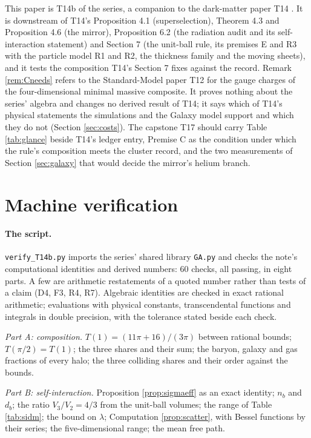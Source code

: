 \documentclass[11pt]{article}
\theoremstyle{definition}
\newcommand{\file}[1]{\texttt{#1}}
\begin{document}
This paper is T14b of the series, a companion to the dark-matter paper T14 \cite{ButlerT14}. It is downstream of T14's Proposition 4.1 (superselection), Theorem 4.3 and Proposition 4.6 (the mirror), Proposition 6.2 (the radiation audit and its self-interaction statement) and Section 7 (the unit-ball rule, its premises E and R3 with the particle model R1 and R2, the thickness family and the moving sheets), and it tests the composition T14's Section 7 fixes against the record. Remark \ref{rem:Cneeds} refers to the Standard-Model paper T12 \cite{ButlerT12} for the gauge charges of the four-dimensional minimal massive composite. It proves nothing about the series' algebra and changes no derived result of T14; it says which of T14's physical statements the simulations and the Galaxy model support and which they do not (Section \ref{sec:costs}). The capstone T17 \cite{ButlerT17} should carry Table \ref{tab:glance} beside T14's ledger entry, Premise C as the condition under which the rule's composition meets the cluster record, and the two measurements of Section \ref{sec:galaxy} that would decide the mirror's helium branch.

\section{Machine verification}\label{sec:verification}

\paragraph{The script.} \file{verify\_T14b.py} \cite{ButlerVerifyT14b} imports the series' shared library \file{GA.py} and checks the note's computational identities and derived numbers: $60$ checks, all passing, in eight parts. A few are arithmetic restatements of a quoted number rather than tests of a claim (D4, F3, R4, R7). Algebraic identities are checked in exact rational arithmetic; evaluations with physical constants, transcendental functions and integrals in double precision, with the tolerance stated beside each check.

\emph{Part A: composition.} $T(1) = (11\pi + 16)/(3\pi)$ between rational bounds; $T(\pi/2) = T(1)$; the three shares and their sum; the baryon, galaxy and gas fractions of every halo; the three colliding shares and their order against the bounds.

\emph{Part B: self-interaction.} Proposition \ref{prop:sigmaeff} as an exact identity; $n_{b}$ and $d_{b}$; the ratio $V_{3}/V_{2} = 4/3$ from the unit-ball volumes; the range of Table \ref{tab:sidm}; the bound on $\lambda$; Computation \ref{prop:scatter}, with Bessel functions by their series; the five-dimensional range; the mean free path.
\end{document}
